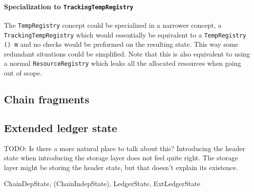 \paragraph{Specialization to \lstinline!TrackingTempRegistry!} The
\lstinline!TempRegistry! concept could be specialized in a narrower concept, a
\lstinline!TrackingTempRegistry! which would essentially be equivalent to a
\lstinline!TempRegistry () m! and no checks would be preformed on the resulting
state. This way some redundant situations could be simplified. Note that this is
also equivalent to using a normal \lstinline!ResourceRegistry! which leaks all
the allocated resources when going out of scope.

\subsection{Chain fragments}
\label{storage:fragments}

\subsection{Extended ledger state}
\label{storage:extledgerstate}
\label{storage:headerstate}

TODO: Is there a more natural place to talk about this? Introducing the
header state when introducing the storage layer does not feel quite right.
The storage layer might be storing the header state, but that doesn't
explain its existence.

ChainDepState, (ChainIndepState), LedgerState, ExtLedgerState

